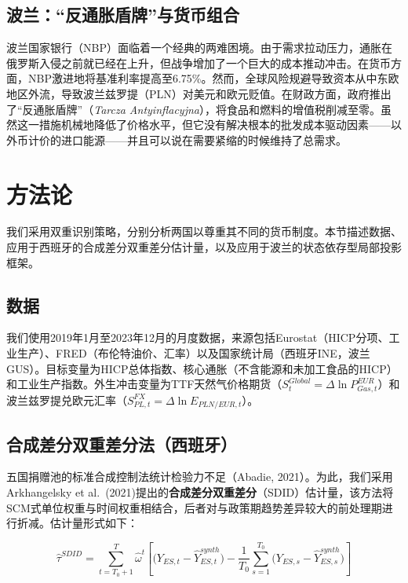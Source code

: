 \documentclass[12pt, a4paper]{article}
\begin{document}
\subsection{波兰：“反通胀盾牌”与货币组合}

波兰国家银行（NBP）面临着一个经典的两难困境。由于需求拉动压力，通胀在俄罗斯入侵之前就已经在上升，但战争增加了一个巨大的成本推动冲击。在货币方面，NBP激进地将基准利率提高至6.75\%。然而，全球风险规避导致资本从中东欧地区外流，导致波兰兹罗提（PLN）对美元和欧元贬值。在财政方面，政府推出了“反通胀盾牌”（\textit{Tarcza Antyinflacyjna}），将食品和燃料的增值税削减至零。虽然这一措施机械地降低了价格水平，但它没有解决根本的批发成本驱动因素——以外币计价的进口能源——并且可以说在需要紧缩的时候维持了总需求。



\section{方法论}

我们采用双重识别策略，分别分析两国以尊重其不同的货币制度。本节描述数据、应用于西班牙的合成差分双重差分估计量，以及应用于波兰的状态依存型局部投影框架。


\subsection{数据}

我们使用2019年1月至2023年12月的月度数据，来源包括Eurostat（HICP分项、工业生产）、FRED（布伦特油价、汇率）以及国家统计局（西班牙INE，波兰GUS）。目标变量为HICP总体指数、核心通胀（不含能源和未加工食品的HICP）和工业生产指数。外生冲击变量为TTF天然气价格期货（$S^{Global}_t = \Delta\ln P_{Gas,t}^{EUR}$）和波兰兹罗提兑欧元汇率（$S^{FX}_{PL,t} = \Delta\ln E_{PLN/EUR,t}$）。


\subsection{合成差分双重差分法（西班牙）}

五国捐赠池的标准合成控制法统计检验力不足（Abadie, 2021）。为此，我们采用Arkhangelsky et al.\ (2021)提出的\textbf{合成差分双重差分}（SDID）估计量，该方法将SCM式单位权重与时间权重相结合，后者对与政策期趋势差异较大的前处理期进行折减。估计量形式如下：

\[
\hat{\tau}^{SDID} = \sum_{t=T_0+1}^{T} \hat{\omega}^t \left[
  \bigl(Y_{ES,t} - \hat{Y}_{ES,t}^{synth}\bigr)
  - \frac{1}{T_0}\sum_{s=1}^{T_0} \bigl(Y_{ES,s} - \hat{Y}_{ES,s}^{synth}\bigr)
\right]
\]
\end{document}
